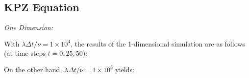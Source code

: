 \documentclass[12pt]{article}
\begin{document}
\subsection{KPZ Equation}

{\it One Dimension:}

With $\lambda \Delta t/\nu = 1\times 10^4$, the results of the 1-dimensional simulation are as follows (at time steps $t = 0, 25, 50$):
\begin{figure}[H]
\end{figure}
\noindent On the other hand, $\lambda \Delta t/\nu = 1\times 10^3$ yields:
\begin{figure}[H]
\end{figure}
\end{document}
